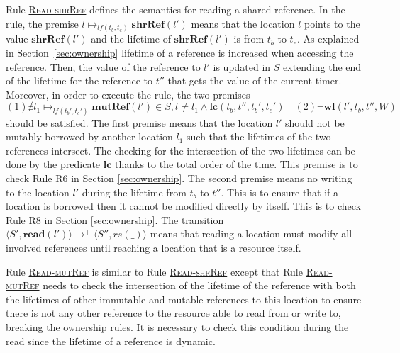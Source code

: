 \documentclass[runningheads]{llncs}
\def\refrule#1{\hyperref[#1]{\textsc{#1}}}
\newcommand{\terminal}[1]{\textbf{#1}}
\newcommand{\cfg}[1]{\langle #1\rangle}
\begin{document}
 Rule \refrule{Read-shrRef} defines the semantics for reading a shared reference.
In the rule, the premise $l\mapsto_{lf(t_b,t_e)} \terminal{shrRef}(l')$ means that
the location $l$ points to the value $\terminal{shrRef}(l')$ and
the lifetime of $\terminal{shrRef}(l')$  is from $t_b$ to $t_e$.
As explained in Section~\ref{sec:ownership} lifetime of a reference is increased when accessing the reference. Then, the value of the reference to $l'$ is updated in $S$ extending the end of the lifetime for the reference to $t''$ that gets the value of the current timer.
Moreover, in order to execute the rule, the two premises\\
\[
(1) \nexists l_1\mapsto_{lf(t_b',t_e')} \terminal{mutRef}(l')\in S,l\neq l_1\land\terminal{lc}(t_b,t'',t_b',t_e')\quad (2)
\neg\terminal{wl}(l',t_b,t'',W)
\]  should be satisfied.
The first premise means that the location $l'$ should not be mutably borrowed by another location $l_1$ such that
the lifetimes of the two references  intersect.
The checking for the intersection of the two lifetimes can be done by the predicate $\terminal{lc}$ thanks to 
the total order of the time. This premise is to check Rule R6 in Section \ref{sec:ownership}.
The second premise means no writing to the location $l'$ during the lifetime from $t_b$ to $t''$.
This is to ensure that if a location is borrowed then it cannot be modified directly by itself. %
This is to check Rule R8 in Section \ref{sec:ownership}.
The transition $\cfg{S',\terminal{read}(l')}\rightarrow^+\cfg{S'',rs(\_)}$ means that reading a location must modify all involved references until reaching a location that is a resource itself.


Rule \refrule{Read-mutRef} is similar to Rule \refrule{Read-shrRef} except that Rule \refrule{Read-mutRef} needs to check
the intersection of the lifetime of the reference with both the lifetimes of other immutable and mutable references to this location to ensure there is not any other reference to the resource able to read from or write to, breaking the ownership rules. It is necessary to check this condition during the read since the lifetime of a reference is dynamic. 

\end{document}
